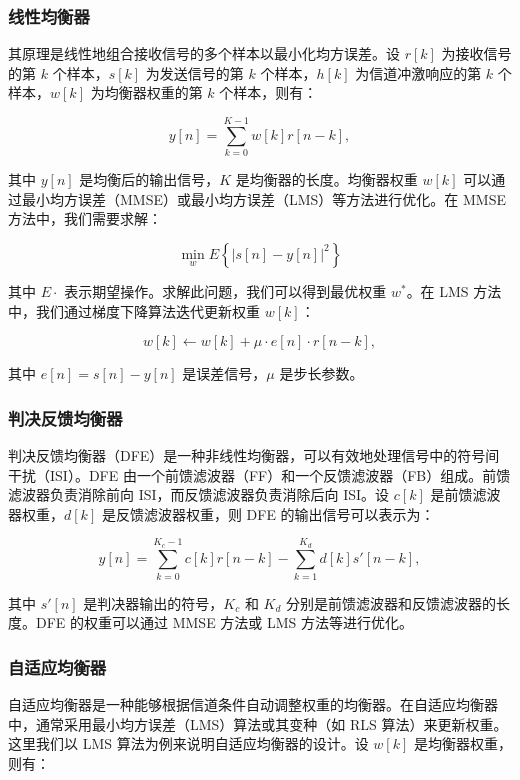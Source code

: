 \documentclass[UTF8,a4paper,12pt]{ctexart}
\numberwithin{equation}{section}
\begin{document}
\subsubsection{线性均衡器}
其原理是线性地组合接收信号的多个样本以最小化均方误差。设 $r[k]$ 为接收信号的第 $k$ 个样本，$s[k]$ 为发送信号的第 $k$ 个样本，$h[k]$ 为信道冲激响应的第 $k$ 个样本，$w[k]$ 为均衡器权重的第 $k$ 个样本，则有：

\begin{equation}
	y[n] = \sum_{k=0}^{K-1} w[k] r[n-k],
\end{equation}

其中 $y[n]$ 是均衡后的输出信号，$K$ 是均衡器的长度。均衡器权重 $w[k]$ 可以通过最小均方误差（MMSE）或最小均方误差（LMS）等方法进行优化。在 MMSE 方法中，我们需要求解：

\begin{equation}
	\min_w E\left\{ |s[n] - y[n]|^2 \right\}
\end{equation}


其中 $E{\cdot}$ 表示期望操作。求解此问题，我们可以得到最优权重 $w^*$。在 LMS 方法中，我们通过梯度下降算法迭代更新权重 $w[k]$：

\begin{equation}
	w[k] \leftarrow w[k] + \mu \cdot e[n] \cdot r[n-k],
\end{equation}

其中 $e[n] = s[n] - y[n]$ 是误差信号，$\mu$ 是步长参数。
\subsubsection{判决反馈均衡器}
判决反馈均衡器（DFE）是一种非线性均衡器，可以有效地处理信号中的符号间干扰（ISI）。DFE 由一个前馈滤波器（FF）和一个反馈滤波器（FB）组成。前馈滤波器负责消除前向 ISI，而反馈滤波器负责消除后向 ISI。设 $c[k]$ 是前馈滤波器权重，$d[k]$ 是反馈滤波器权重，则 DFE 的输出信号可以表示为：

\begin{equation}
	y[n] = \sum_{k=0}^{K_c-1} c[k] r[n-k] - \sum_{k=1}^{K_d} d[k] s'[n-k],
\end{equation}

其中 $s'[n]$ 是判决器输出的符号，$K_c$ 和 $K_d$ 分别是前馈滤波器和反馈滤波器的长度。DFE 的权重可以通过 MMSE 方法或 LMS 方法等进行优化。
\subsubsection{自适应均衡器}
自适应均衡器是一种能够根据信道条件自动调整权重的均衡器。在自适应均衡器中，通常采用最小均方误差（LMS）算法或其变种（如 RLS 算法）来更新权重。这里我们以 LMS 算法为例来说明自适应均衡器的设计。设 $w[k]$ 是均衡器权重，则有：
\end{document}

